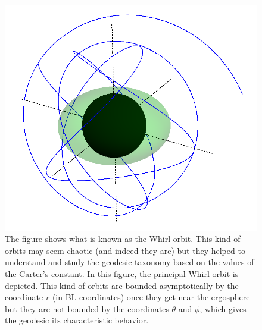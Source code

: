 \begin{figure}
\centering
 \hspace*{-0.05\textwidth}
\centerline{\includegraphics[width=1\textwidth]{img/Chapter4/Whirl.png}}
\caption{The figure shows what is known as the Whirl orbit. This kind of orbits may seem chaotic (and indeed they are) but they helped to understand and study the geodesic taxonomy based on the values of the Carter's constant. In this figure, the principal Whirl orbit is depicted. This kind of orbits are bounded asymptotically by the coordinate $r$ (in \gls{BL} coordinates) once they get near the ergosphere but they are not bounded by the coordinates $\theta$ and $\phi$, which gives the geodesic its characteristic behavior.}
\end{figure}

\clearpage

